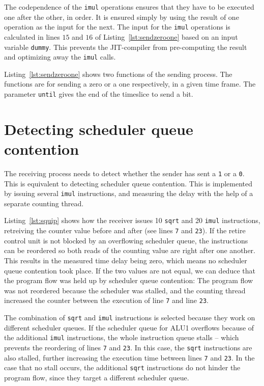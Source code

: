 \documentclass[11pt,
  titlepage=false,
  parskip=half,      %
]{scrreprt}
\begin{document}
The codependence of the \texttt{imul} operations ensures that they have to be executed one after the other, in order.
It is ensured simply by using the result of one operation as the input for the next.
The input for the \texttt{imul} operations is calculated in lines $15$ and $16$ of Listing~\ref{lst:sendzeroone} based on an input variable \texttt{dummy}.
This prevents the JIT-compiler from pre-computing the result and optimizing away the \texttt{imul} calls.


Listing~\ref{lst:sendzeroone} shows two functions of the sending process.
The functions are for sending a zero or a one respectively, in a given time frame.
The parameter \texttt{until} gives the end of the timeslice to send a bit.

\section{Detecting scheduler queue contention}
\label{sec:detect-sqc}
The receiving process needs to detect whether the sender has sent a \texttt{1} or a \texttt{0}.
This is equivalent to detecting scheduler queue contention.
This is implemented by issuing several \texttt{imul} instructions,
and measuring the delay with the help of a separate counting thread.

Listing~\ref{lst:squip} shows how the receiver issues 10 \texttt{sqrt} and 20 \texttt{imul} instructions,
retreiving the counter value before and after (see lines \texttt{7} and \texttt{23}).
If the retire control unit is not blocked by an overflowing scheduler queue,
the instructions can be reordered so both reads of the counting value are right after one another.
This results in the measured time delay being zero, which means no scheduler queue contention took place.
If the two values are not equal, we can deduce that the program flow was held up by scheduler queue contention:
The program flow was not reordered because the scheduler was stalled, and the counting thread increased the counter
between the execution of line \texttt{7} and line \texttt{23}.

The combination of \texttt{sqrt} and \texttt{imul} instructions is selected because they work on different scheduler queues.
If the scheduler queue for ALU1 overflows because of the additional \texttt{imul} instructions,
the whole instruction queue stalls -- which prevents the reordering of lines \texttt{7} and \texttt{23}.
In this case, the \texttt{sqrt} instructions are also stalled, further increasing the execution time between lines \texttt{7} and \texttt{23}.
In the case that no stall occurs, the additional \texttt{sqrt} instructions do not hinder the program flow,
since they target a different scheduler queue.
\end{document}
